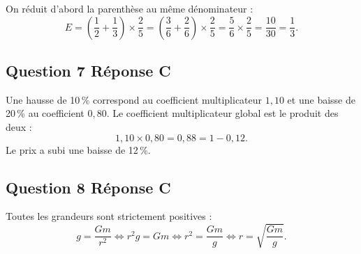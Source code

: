On réduit d'abord la parenthèse au même dénominateur :
\[E = \left(\dfrac{1}{2} + \dfrac{1}{3}\right)\times\dfrac{2}{5}
= \left(\dfrac{3}{6} + \dfrac{2}{6}\right)\times\dfrac{2}{5}
= \dfrac{5}{6}\times\dfrac{2}{5} = \dfrac{10}{30} = \dfrac{1}{3}.\]

\subsection*{Question 7 \quad Réponse C}

Une hausse de 10\,\% correspond au coefficient multiplicateur $1,10$ et une baisse de
20\,\% au coefficient $0,80$. Le coefficient multiplicateur global est le produit
des deux :
\[1,10 \times 0,80 = 0,88 = 1 - 0,12.\]
Le prix a subi une baisse de 12\,\%.

\subsection*{Question 8 \quad Réponse C}

Toutes les grandeurs sont strictement positives :
\[g = \dfrac{Gm}{r^2} \iff r^2 g = Gm \iff r^2 = \dfrac{Gm}{g} \iff r = \sqrt{\dfrac{Gm}{g}}.\]

